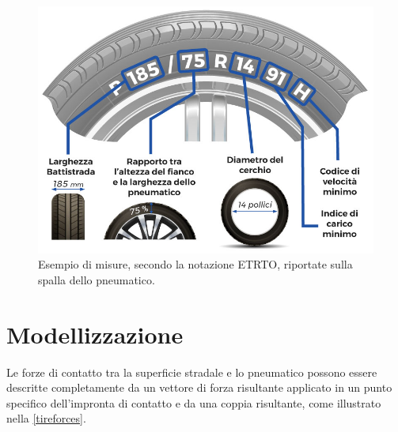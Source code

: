 \begin{figure}[h]
	\centering
	\includegraphics[width=0.7\linewidth]{Figures/tire_measures}
	\caption{Esempio di misure, secondo la notazione ETRTO, riportate sulla spalla dello pneumatico.}
	\label{tiremeasures}
\end{figure}
%
\section{Modellizzazione}
Le forze di contatto tra la superficie stradale e lo pneumatico possono essere descritte completamente da un vettore di forza risultante applicato in un punto specifico dell'impronta di contatto e da una coppia risultante, come illustrato nella \figurename{  \ref{tireforces}}.

